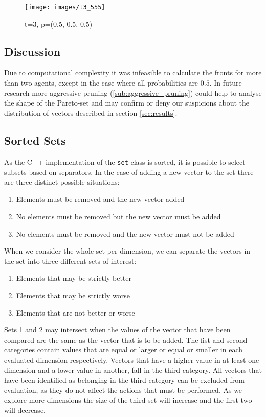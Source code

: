 \documentclass{article}
\begin{document}
	\begin{figure}
		\centering
		\texttt{[image: images/t3\_555]}
		\caption{t=3, p=(0.5, 0.5, 0.5)}
		\label{fig:t3_555}
	\end{figure}

	\begin{multicols}{2}
	\section{Discussion}
	\label{sec:discussion}
	Due to computational complexity it was infeasible to calculate the fronts
	for more than two agents, except in the case where all probabilities are
	$0.5$. In future research more aggressive pruning
	(\ref{sub:aggressive_pruning}) could help to analyse the shape of the
	Pareto-set and may confirm or deny our suspicions about the distribution of
	vectors described in section \ref{sec:results}.
	\subsection{Sorted Sets}
		\label{sub:sorted_sets}
		As the C++ implementation of the \texttt{set} class is sorted, it is
		possible to select subsets based on separators. In the case of adding a
		new vector to the set there are three distinct possible situations:
		\begin{enumerate}
			\item Elements must be removed and the new vector added
			\item No elements must be removed but the new vector must be added
			\item No elements must be removed and the new vector must not be added
		\end{enumerate}
		When we consider the whole set per dimension, we can separate the vectors
		in the set into three different sets of interest:
		\begin{enumerate}
			\item Elements that may be strictly better
			\item Elements that may be strictly worse
			\item Elements that are not better or worse
		\end{enumerate}
		Sets 1 and 2 may intersect when the values of the vector that have been
		compared are the same as the vector that is to be added.  The fist and
		second categories contain values that are equal or larger or equal or
		smaller in each evaluated dimension respectively. Vectors that have a
		higher value in at least one dimension and a lower value in another, fall
		in the third category. All vectors that have been identified as belonging
		in the third category can be excluded from evaluation, as they do not
		affect the actions that must be performed. As we explore more dimensions
		the size of the third set will increase and the first two will decrease.


\end{multicols}
\end{document}
